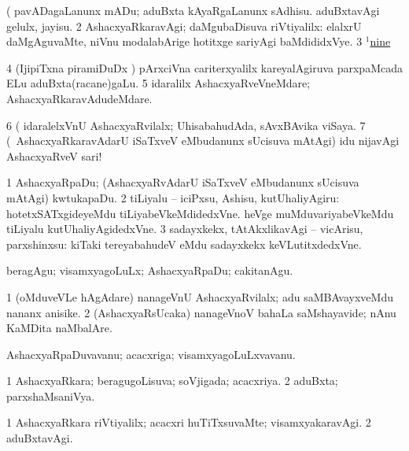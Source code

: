 \noindent
\gl{\pagu}
\expl{}
\bmng
\bnum
{}  (  
\banum
{} pavADagaLanunx mADu; aduBxta kAyaRgaLanunx sAdhisu. 
 aduBxtavAgi gelulx, jayisu. 
\eanum
\numie
\num{2}  AshacxyaRkaravAgi; daMgubaDisuva riVtiyalilx:  elalxrU daMgAguvaMte, niVnu modalabArige hotitxge sariyAgi baMdididxVye. 
\num{3} \hyperref{kandict_n.pdf}{N}{nine(1) pagu(3)}{$^1$nine}  
\num{4}  (IjipiTxna piramiDuDx \mo) pArxciVna cariterxyalilx kareyalAgiruva parxpaMcada ELu aduBxta(racane)gaLu. 
\num{5}  idaralilx AshacxyaRveVneMdare; AshacxyaRkaravAdudeMdare. 
\num{6}  (  idaralelxVnU AshacxyaRvilalx; UhisabahudAda, sAvxBAvika viSaya. 
\num{7}  (\sA\ AshacxyaRkaravAdarU iSaTxveV eMbudanunx sUcisuva mAtAgi) idu nijavAgi AshacxyaRveV sari! 
\enum
\emng
\eentry

\bentry
{} 
\gl{\sakirx}
\expl{}
\bmng
\bnum
\num{1} AshacxyaRpaDu; (AshacxyaRvAdarU iSaTxveV eMbudanunx sUcisuva mAtAgi) kwtukapaDu. 
\num{2} tiLiyalu -- iciPxsu, Ashisu, kutUhaliyAgiru:  hotetxSATxgideyeMdu tiLiyabeVkeMdidedxVne.  heVge muMduvariyabeVkeMdu tiLiyalu kutUhaliyAgidedxVne. 
\num{3} sadayxkekx, tAtAkxlikavAgi -- vicArisu, parxshinxsu:  kiTaki tereyabahudeV eMdu sadayxkekx keVLutitxdedxVne. 
\enum
\emng

\noindent 
\gl{\akirx}
\expl{}
\bmng
beragAgu; visamxyagoLuLx; AshacxyaRpaDu; cakitanAgu. 
\emng

\noindent
\gl{\pagu}
\expl{}
\bmng
\bnum
\num{1}  (oMduveVLe hAgAdare) nanageVnU AshacxyaRvilalx; adu saMBAvayxveMdu nananx anisike. 
\num{2}  (AshacxyaRsUcaka) nanageVnoV bahaLa saMshayavide; nAnu KaMDita naMbalAre. 
\enum
\emng
\eentry

\bentry
{} 
\gl{\nA}
\expl{}
\bmng
AshacxyaRpaDuvavanu; acacxriga; visamxyagoLuLxvavanu. 
\emng
\eentry

\bentry
{} 
\gl{\gu}
\expl{}
\bmng
\bnum
\num{1} AshacxyaRkara; beragugoLisuva; soVjigada; acacxriya. 
\num{2} aduBxta; parxshaMsaniVya. 
\enum
\emng
\eentry

\bentry
{} 
\gl{\kirxvi}
\expl{}
\bmng
\bnum
\num{1} AshacxyaRkara riVtiyalilx; acacxri huTiTxsuvaMte; visamxyakaravAgi. 
\num{2} aduBxtavAgi. 
\enum
\emng
\eentry

